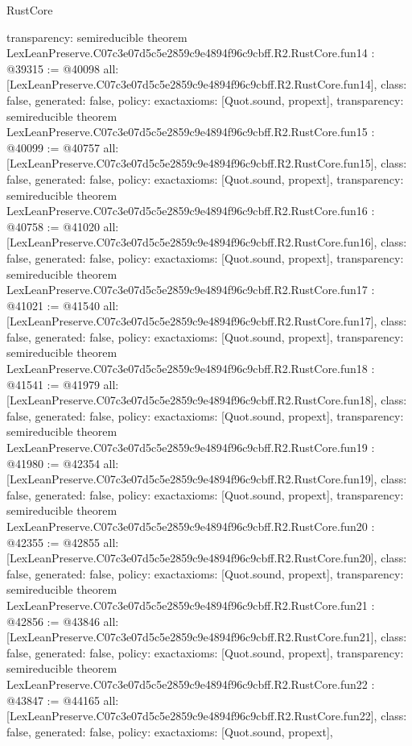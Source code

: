 \begin{lexlean}{RustCore}
\begin{coremodule}
{  transparency: semireducible
}
theorem LexLeanPreserve.C07c3e07d5c5e2859c9e4894f96c9cbff.R2.RustCore.fun14 : @39315 := @40098 {
  all: [LexLeanPreserve.C07c3e07d5c5e2859c9e4894f96c9cbff.R2.RustCore.fun14],
  class: false,
  generated: false,
  policy: exact{axioms: [Quot.sound, propext]},
  transparency: semireducible
}
theorem LexLeanPreserve.C07c3e07d5c5e2859c9e4894f96c9cbff.R2.RustCore.fun15 : @40099 := @40757 {
  all: [LexLeanPreserve.C07c3e07d5c5e2859c9e4894f96c9cbff.R2.RustCore.fun15],
  class: false,
  generated: false,
  policy: exact{axioms: [Quot.sound, propext]},
  transparency: semireducible
}
theorem LexLeanPreserve.C07c3e07d5c5e2859c9e4894f96c9cbff.R2.RustCore.fun16 : @40758 := @41020 {
  all: [LexLeanPreserve.C07c3e07d5c5e2859c9e4894f96c9cbff.R2.RustCore.fun16],
  class: false,
  generated: false,
  policy: exact{axioms: [Quot.sound, propext]},
  transparency: semireducible
}
theorem LexLeanPreserve.C07c3e07d5c5e2859c9e4894f96c9cbff.R2.RustCore.fun17 : @41021 := @41540 {
  all: [LexLeanPreserve.C07c3e07d5c5e2859c9e4894f96c9cbff.R2.RustCore.fun17],
  class: false,
  generated: false,
  policy: exact{axioms: [Quot.sound, propext]},
  transparency: semireducible
}
theorem LexLeanPreserve.C07c3e07d5c5e2859c9e4894f96c9cbff.R2.RustCore.fun18 : @41541 := @41979 {
  all: [LexLeanPreserve.C07c3e07d5c5e2859c9e4894f96c9cbff.R2.RustCore.fun18],
  class: false,
  generated: false,
  policy: exact{axioms: [Quot.sound, propext]},
  transparency: semireducible
}
theorem LexLeanPreserve.C07c3e07d5c5e2859c9e4894f96c9cbff.R2.RustCore.fun19 : @41980 := @42354 {
  all: [LexLeanPreserve.C07c3e07d5c5e2859c9e4894f96c9cbff.R2.RustCore.fun19],
  class: false,
  generated: false,
  policy: exact{axioms: [Quot.sound, propext]},
  transparency: semireducible
}
theorem LexLeanPreserve.C07c3e07d5c5e2859c9e4894f96c9cbff.R2.RustCore.fun20 : @42355 := @42855 {
  all: [LexLeanPreserve.C07c3e07d5c5e2859c9e4894f96c9cbff.R2.RustCore.fun20],
  class: false,
  generated: false,
  policy: exact{axioms: [Quot.sound, propext]},
  transparency: semireducible
}
theorem LexLeanPreserve.C07c3e07d5c5e2859c9e4894f96c9cbff.R2.RustCore.fun21 : @42856 := @43846 {
  all: [LexLeanPreserve.C07c3e07d5c5e2859c9e4894f96c9cbff.R2.RustCore.fun21],
  class: false,
  generated: false,
  policy: exact{axioms: [Quot.sound, propext]},
  transparency: semireducible
}
theorem LexLeanPreserve.C07c3e07d5c5e2859c9e4894f96c9cbff.R2.RustCore.fun22 : @43847 := @44165 {
  all: [LexLeanPreserve.C07c3e07d5c5e2859c9e4894f96c9cbff.R2.RustCore.fun22],
  class: false,
  generated: false,
  policy: exact{axioms: [Quot.sound, propext]},
}
\end{coremodule}
\end{lexlean}
